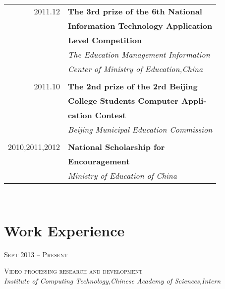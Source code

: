 \documentclass[10pt,a4paper]{article} %
\begin{document}
\begin{minipage}[t]{0.44\textwidth}
\begin{tabular}{rl}
2011.12     & \small\textbf{The 3rd prize of the 6th National} \\
& \small\textbf{ Information Technology Application }\\
& \small\textbf{ Level Competition}\\
& \small\textit{The Education Management Information}\\
& \small\textit{ Center of Ministry of Education,China}\\ \\

2011.10     & \small\textbf{The 2nd prize of the 2rd Beijing}\\
& \small\textbf{ College Students Computer Appli-}\\
& \small\textbf{ cation Contest}\\
& \small\textit{Beijing Municipal Education Commission}\\ \\

2010,2011,2012    & \small\textbf{National Scholarship for }\\
& \small\textbf{ Encouragement}\\
& \small\textit{Ministry of Education of China}

\end{tabular}\\[0pt]


\section{Work Experience}
{\raggedleft\textsc{Sept 2013 -- Present}\par}

{\raggedright \small\textsc{Video processing research and development }\\

\textit{ Institute of Computing Technology,Chinese Academy of Sciences,Intern}\\}


\end{minipage}
\end{document}
